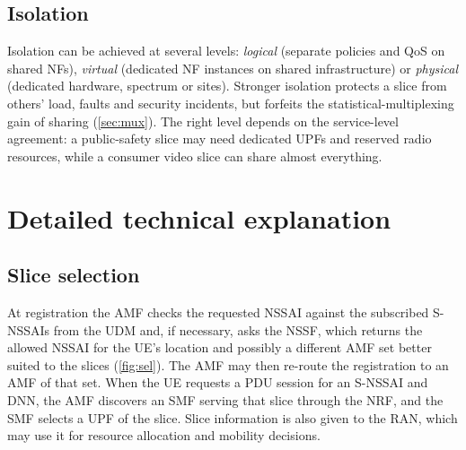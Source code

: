 \documentclass[11pt,a4paper]{article}
\begin{document}
\begin{acnfigure}
  \caption{Three end-to-end slices sharing RAN and common control functions, with slice-specific SMFs and UPFs.}
  \label{fig:slices}
\end{acnfigure}

\subsection{Isolation}
Isolation can be achieved at several levels: \emph{logical} (separate policies and QoS on shared NFs), \emph{virtual} (dedicated NF
instances on shared infrastructure) or \emph{physical} (dedicated hardware, spectrum or sites). Stronger isolation protects a slice from
others' load, faults and security incidents, but forfeits the statistical-multiplexing gain of sharing (\cref{sec:mux}). The right level
depends on the service-level agreement: a public-safety slice may need dedicated UPFs and reserved radio resources, while a consumer video
slice can share almost everything.

\section{Detailed technical explanation}

\subsection{Slice selection}
At registration the AMF checks the requested NSSAI against the subscribed S-NSSAIs from the UDM and, if necessary, asks the NSSF, which
returns the allowed NSSAI for the UE's location and possibly a different AMF set better suited to the slices (\cref{fig:sel}). The AMF may
then re-route the registration to an AMF of that set. When the UE requests a PDU session for an S-NSSAI and DNN, the AMF discovers an SMF
serving that slice through the NRF, and the SMF selects a UPF of the slice. Slice information is also given to the RAN, which may use it
for resource allocation and mobility decisions.

\begin{acnfigure}
  \caption{Slice selection at registration and slice-specific PDU session set-up (simplified).}
  \label{fig:sel}
\end{acnfigure}
\end{document}
